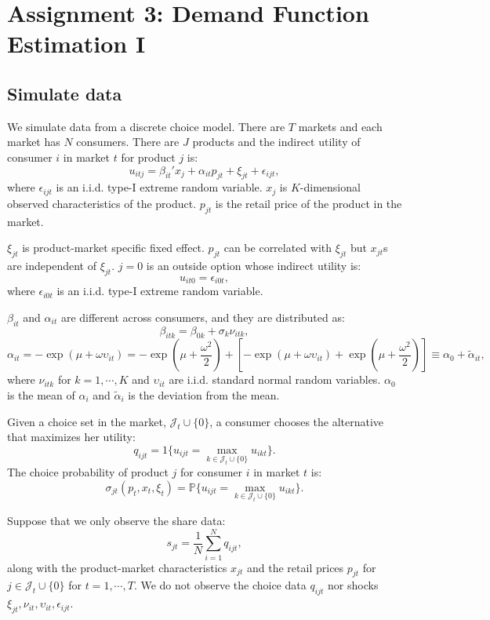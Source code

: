 \documentclass[
]{book}
\begin{document}
\hypertarget{assignment3}{%
\chapter{Assignment 3: Demand Function Estimation I}\label{assignment3}}

\hypertarget{simulate-data-2}{%
\section{Simulate data}\label{simulate-data-2}}

We simulate data from a discrete choice model. There are \(T\) markets and each market has \(N\) consumers. There are \(J\) products and the indirect utility of consumer \(i\) in market \(t\) for product \(j\) is:
\[
u_{itj} = \beta_{it}' x_j + \alpha_{it} p_{jt} + \xi_{jt} + \epsilon_{ijt},
\]
where \(\epsilon_{ijt}\) is an i.i.d. type-I extreme random variable. \(x_j\) is \(K\)-dimensional observed characteristics of the product. \(p_{jt}\) is the retail price of the product in the market.

\(\xi_{jt}\) is product-market specific fixed effect. \(p_{jt}\) can be correlated with \(\xi_{jt}\) but \(x_{jt}\)s are independent of \(\xi_{jt}\). \(j = 0\) is an outside option whose indirect utility is:
\[
u_{it0} = \epsilon_{i0t},
\]
where \(\epsilon_{i0t}\) is an i.i.d. type-I extreme random variable.

\(\beta_{it}\) and \(\alpha_{it}\) are different across consumers, and they are distributed as:
\[
\beta_{itk} = \beta_{0k} + \sigma_k \nu_{itk},
\]
\[
\alpha_{it} = - \exp(\mu + \omega \upsilon_{it}) = - \exp(\mu + \frac{\omega^2}{2}) + [- \exp(\mu + \omega \upsilon_{it}) + \exp(\mu + \frac{\omega^2}{2})] \equiv \alpha_0 + \tilde{\alpha}_{it},
\]
where \(\nu_{itk}\) for \(k = 1, \cdots, K\) and \(\upsilon_{it}\) are i.i.d. standard normal random variables. \(\alpha_0\) is the mean of \(\alpha_i\) and \(\tilde{\alpha}_i\) is the deviation from the mean.

Given a choice set in the market, \(\mathcal{J}_t \cup \{0\}\), a consumer chooses the alternative that maximizes her utility:
\[
q_{ijt} = 1\{u_{ijt} = \max_{k \in \mathcal{J}_t \cup \{0\}} u_{ikt}\}.
\]
The choice probability of product \(j\) for consumer \(i\) in market \(t\) is:
\[
\sigma_{jt}(p_t, x_t, \xi_t) = \mathbb{P}\{u_{ijt} = \max_{k \in \mathcal{J}_t \cup \{0\}} u_{ikt}\}.
\]

Suppose that we only observe the share data:
\[
s_{jt} = \frac{1}{N} \sum_{i = 1}^N q_{ijt},
\]
along with the product-market characteristics \(x_{jt}\) and the retail prices \(p_{jt}\) for \(j \in \mathcal{J}_t \cup \{0\}\) for \(t = 1, \cdots, T\). We do not observe the choice data \(q_{ijt}\) nor shocks \(\xi_{jt}, \nu_{it}, \upsilon_{it}, \epsilon_{ijt}\).
\end{document}
